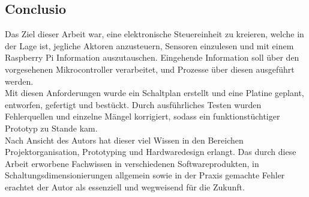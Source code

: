 \newpage
\subsection{Conclusio}

Das Ziel dieser Arbeit war, eine elektronische Steuereinheit zu kreieren, welche in der Lage ist, jegliche Aktoren anzusteuern, Sensoren einzulesen und mit einem Raspberry Pi Information auszutauschen.
Eingehende Information soll über den vorgesehenen Mikrocontroller verarbeitet, und Prozesse über diesen ausgeführt werden. \\

Mit diesen Anforderungen wurde ein Schaltplan erstellt und eine Platine geplant, entworfen, gefertigt und bestückt.
Durch ausführliches Testen wurden Fehlerquellen und einzelne Mängel korrigiert, sodass ein funktionstüchtiger Prototyp zu Stande kam.\\

Nach Ansicht des Autors hat dieser viel Wissen in den Bereichen Projektorganisation, Prototyping und Hardwaredesign erlangt.
Das durch diese Arbeit erworbene Fachwissen in verschiedenen Softwareprodukten,
in Schaltungsdimensionierungen allgemein sowie in der Praxis gemachte Fehler erachtet der Autor als essenziell und wegweisend für die Zukunft.

